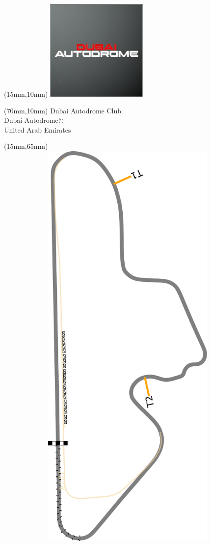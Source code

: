 \null\newpage
\begin{textblock*}{50mm}(15mm,10mm)%
\includegraphics[width=50mm]{LG/2015-05-20_00081.png}
\end{textblock*}
\begin{textblock*}{130mm}(70mm,10mm)%
{\fontsize{20}{20}\selectfont Dubai Autodrome Club\\}
{\fontsize{16}{16}\selectfont Dubai Autodrome\hfill \Large$\circlearrowright$\\}
{\fontsize{12}{12}\selectfont United Arab Emirates\\}
\end{textblock*}
\begin{textblock*}{185mm}(15mm,65mm)%
\centering
\mbox{\includegraphics[width=185mm,height=210mm,keepaspectratio]{PT/DUAUCL.pdf}}
\end{textblock*}
